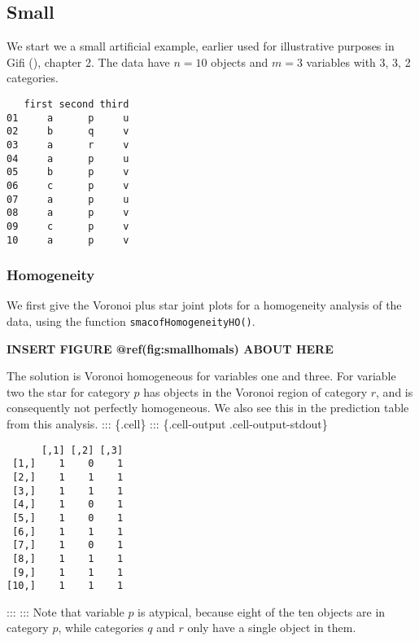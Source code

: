 \documentclass[
  12pt,
  letterpaper,
  DIV=11,
  numbers=noendperiod]{scrartcl}
\begin{document}
\subsection{Small}\label{small}

We start we a small artificial example, earlier used for illustrative
purposes in Gifi (), chapter 2. The data
have \(n=10\) objects and \(m=3\) variables with 3, 3, 2 categories.

\begin{verbatim}
   first second third
01     a      p     u
02     b      q     v
03     a      r     v
04     a      p     u
05     b      p     v
06     c      p     v
07     a      p     u
08     a      p     v
09     c      p     v
10     a      p     v
\end{verbatim}

\subsubsection{Homogeneity}\label{homogeneity}

We first give the Voronoi plus star joint plots for a homogeneity
analysis of the data, using the function \texttt{smacofHomogeneityHO()}.

\begin{greybox}

\begin{center}
\textbf{INSERT FIGURE @ref(fig:smallhomals) ABOUT HERE}

\end{center}

\end{greybox}

The solution is Voronoi homogeneous for variables one and three. For
variable two the star for category \(p\) has objects in the Voronoi
region of category \(r\), and is consequently not perfectly homogeneous.
We also see this in the prediction table from this analysis. :::
\{.cell\} ::: \{.cell-output .cell-output-stdout\}

\begin{verbatim}
      [,1] [,2] [,3]
 [1,]    1    0    1
 [2,]    1    1    1
 [3,]    1    1    1
 [4,]    1    0    1
 [5,]    1    0    1
 [6,]    1    1    1
 [7,]    1    0    1
 [8,]    1    1    1
 [9,]    1    1    1
[10,]    1    1    1
\end{verbatim}

::: ::: Note that variable \(p\) is atypical, because eight of the ten
objects are in category \(p\), while categories \(q\) and \(r\) only
have a single object in them.
\end{document}
